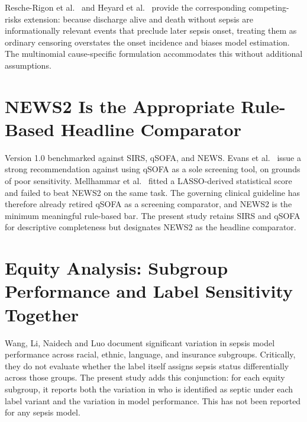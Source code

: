 Resche-Rigon et al.\ \parencite{rescherigon2006competing} and Heyard et al.\
\parencite{heyard2019dynamic, heyard2020evaluation} provide the corresponding
competing-risks extension: because discharge alive and death without sepsis are
informationally relevant events that preclude later sepsis onset, treating them
as ordinary censoring overstates the onset incidence and biases model estimation.
The multinomial cause-specific formulation accommodates this without additional
assumptions.

\section{NEWS2 Is the Appropriate Rule-Based Headline Comparator}

Version 1.0 benchmarked against SIRS, qSOFA, and NEWS. Evans et al.\
\parencite{evans2021ssc} issue a strong recommendation against using qSOFA as a
sole screening tool, on grounds of poor sensitivity. Mellhammar et al.\
\parencite{mellhammar2020news2} fitted a LASSO-derived statistical score and
failed to beat NEWS2 on the same task. The governing clinical guideline has
therefore already retired qSOFA as a screening comparator, and NEWS2 is the
minimum meaningful rule-based bar. The present study retains SIRS and qSOFA for
descriptive completeness but designates NEWS2 as the headline comparator.

\section{Equity Analysis: Subgroup Performance and Label Sensitivity Together}

Wang, Li, Naidech and Luo \parencite{wang2022equity} document significant
variation in sepsis model performance across racial, ethnic, language, and
insurance subgroups. Critically, they do not evaluate whether the label itself
assigns sepsis status differentially across those groups. The present study adds
this conjunction: for each equity subgroup, it reports both the variation in who
is identified as septic under each label variant and the variation in model
performance. This has not been reported for any sepsis model.

